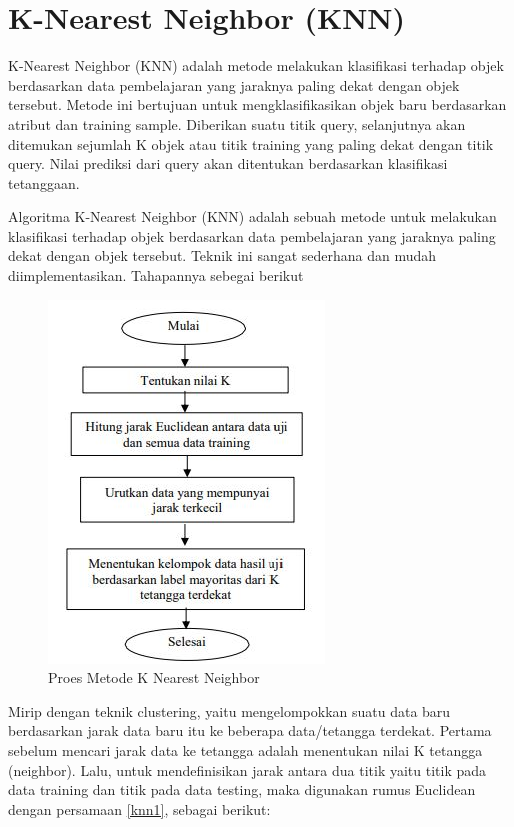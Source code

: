 \section{K-Nearest Neighbor (KNN)}
\par K-Nearest Neighbor (KNN) adalah metode melakukan klasifikasi terhadap objek
berdasarkan data pembelajaran yang jaraknya paling dekat dengan objek tersebut. Metode ini bertujuan untuk mengklasifikasikan objek baru berdasarkan atribut dan training sample.
Diberikan suatu titik query, selanjutnya akan ditemukan sejumlah K objek atau titik training yang paling dekat dengan titik query. Nilai prediksi dari query akan ditentukan berdasarkan klasifikasi tetanggaan. \par 
Algoritma K-Nearest Neighbor (KNN) adalah sebuah metode untuk melakukan klasifikasi terhadap objek berdasarkan data pembelajaran yang jaraknya paling dekat dengan objek tersebut. 
Teknik ini sangat sederhana dan mudah diimplementasikan. Tahapannya sebegai berikut 
\begin{figure}
    \centering
    \includegraphics[scale=0.6]{figures/metodeknn.JPG}
    \caption{Proes Metode K Nearest Neighbor}
    \label{fig:my_label}
\end{figure}

Mirip dengan teknik clustering, yaitu mengelompokkan suatu data baru berdasarkan jarak data baru itu ke beberapa data/tetangga terdekat. Pertama sebelum mencari jarak data ke tetangga adalah menentukan nilai K tetangga (neighbor). Lalu, untuk mendefinisikan jarak antara dua titik yaitu titik pada data training dan titik pada data testing, maka digunakan rumus Euclidean dengan persamaan \ref{knn1}, sebagai berikut:

